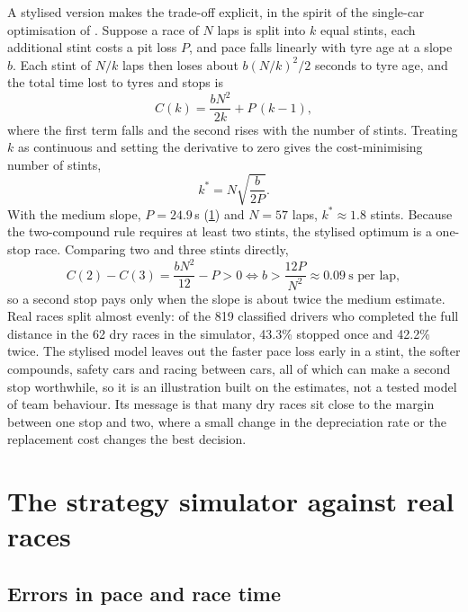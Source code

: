 \documentclass[12pt]{article}
\begin{document}
A stylised version makes the trade-off explicit, in the spirit of the single-car optimisation of
\textcite{heilmeier2020vse}. Suppose a race of $N$ laps is split into $k$ equal stints, each additional stint costs a
pit loss $P$, and pace falls linearly with tyre age at a slope $b$. Each stint of $N/k$ laps then loses about
$b(N/k)^2/2$ seconds to tyre age, and the total time lost to tyres and stops is
\begin{equation}\label{eq:replace}
  C(k) = \frac{bN^{2}}{2k} + P\,(k-1),
\end{equation}
where the first term falls and the second rises with the number of stints. Treating $k$ as continuous and setting the
derivative to zero gives the cost-minimising number of stints,
\begin{equation}\label{eq:kstar}
  k^{*} = N\sqrt{\frac{b}{2P}} .
\end{equation}
With the medium slope, $P=24.9$\,s (\cref{sec:sim}) and $N=57$ laps, $k^{*}\approx1.8$ stints. Because the two-compound
rule requires at least two stints, the stylised optimum is a one-stop race. Comparing two and three stints directly,
\begin{equation}\label{eq:twostop}
  C(2)-C(3) = \frac{bN^{2}}{12} - P > 0 \iff b > \frac{12P}{N^{2}} \approx 0.09\ \text{s per lap},
\end{equation}
so a second stop pays only when the slope is about twice the medium estimate. Real races split almost evenly: of the 819
classified drivers who completed the full distance in the 62 dry races in the simulator, 43.3\% stopped once and 42.2\%
twice. The stylised model leaves out the faster pace loss early in a stint, the softer compounds, safety cars and racing
between cars, all of which can make a second stop worthwhile, so it is an illustration built on the estimates, not a
tested model of team behaviour. Its message is that many dry races sit close to the margin between one stop and two,
where a small change in the depreciation rate or the replacement cost changes the best decision.

\section{The strategy simulator against real races}\label{sec:sim}

\subsection{Errors in pace and race time}\label{sec:simerr}
\end{document}
